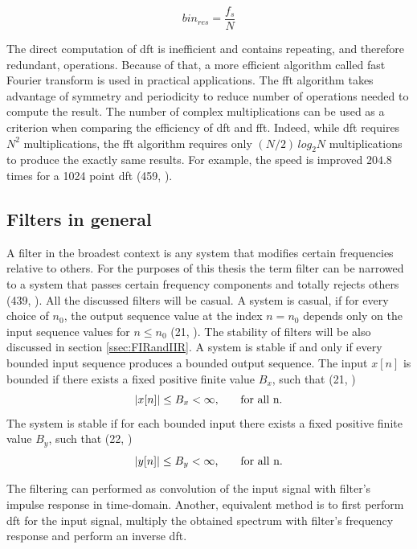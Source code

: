\begin{equation}
\label{eq:DFTres}
bin_{res} = \frac{f_s}{N}
\end{equation}

The direct computation of \gls{dft} is inefficient and contains repeating, and therefore redundant, operations. Because of that, a more efficient algorithm called fast Fourier transform is used in practical applications. The \gls{fft} algorithm takes advantage of symmetry and periodicity to reduce number of operations needed to compute the result. The number of complex multiplications can be used as a criterion when comparing the efficiency of \gls{dft} and \gls{fft}. Indeed, while \gls{dft} requires $N^2$ multiplications, the \gls{fft} algorithm requires only $(N/2)\,log_2N$ multiplications to produce the exactly same results. For example, the speed is improved $204.8$ times for a 1024 point \gls{dft} (459, \cite{DSP3}).

\subsection{Filters in general}
A filter in the broadest context is any system that modifies certain frequencies relative to others. For the purposes of this thesis the term filter can be narrowed to a system that passes certain frequency components and totally rejects others (439, \cite{DSP}). All the discussed filters will be casual. A system is casual, if for every choice of $n_0$, the output sequence value at the index $n = n_0$ depends only on the input sequence values for $n \leq n_0$ (21, \cite{DSP}). The stability of filters will be also discussed in section \ref{ssec:FIRandIIR}. A system is stable if and only if every bounded input sequence produces a bounded output sequence. The input $x[n]$ is bounded if there exists a fixed positive finite value $B_x$, such that (21, \cite{DSP})
\begin{equation}
	|x[n]| \leq B_x < \infty\text{,\qquad for all n.}
\end{equation}
The system is stable if for each bounded input there exists a fixed positive finite value $B_y$, such that (22, \cite{DSP})
\begin{equation}
	|y[n]| \leq B_y < \infty\text{,\qquad for all n.}
\end{equation}

The filtering can performed as convolution of the input signal with filter's impulse response in time-domain. Another, equivalent method is to first perform \gls{dft} for the input signal, multiply the obtained spectrum with filter's frequency response and perform an inverse \gls{dft}. 

